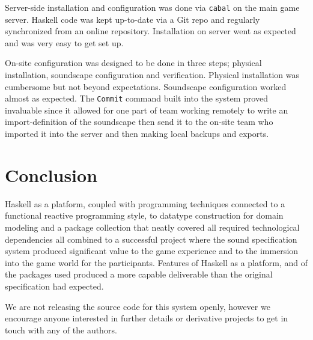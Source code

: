 Server-side installation and configuration was done via \texttt{cabal} on the main game server. Haskell code was kept up-to-date via a Git repo and regularly synchronized from an online repository. Installation on server went as expected and was very easy to get set up. 

On-site configuration was designed to be done in three steps; physical
installation, soundscape configuration and verification. Physical
installation was cumbersome but not beyond expectations. Soundscape
configuration worked almost as expected. The \texttt{Commit} command built into the system proved invaluable since it allowed for one part of team working remotely to write an import-definition of the soundscape then send it to the on-site team who imported it into the server and then making local backups and exports.

\section{Conclusion}
\label{sec:conclusion}

Haskell as a platform, coupled with programming techniques connected
to a functional reactive programming style, to datatype construction
for domain modeling and a package collection that neatly covered all
required technological dependencies all combined to a successful
project where the sound specification system produced significant
value to the game experience and to the immersion into the game world
for the participants. Features of Haskell as a platform, and of the
packages used produced a more capable deliverable than the original
specification had expected.

We are not releasing the source code for this system openly, however
we encourage anyone interested in further details or derivative
projects to get in touch with any of the authors.


